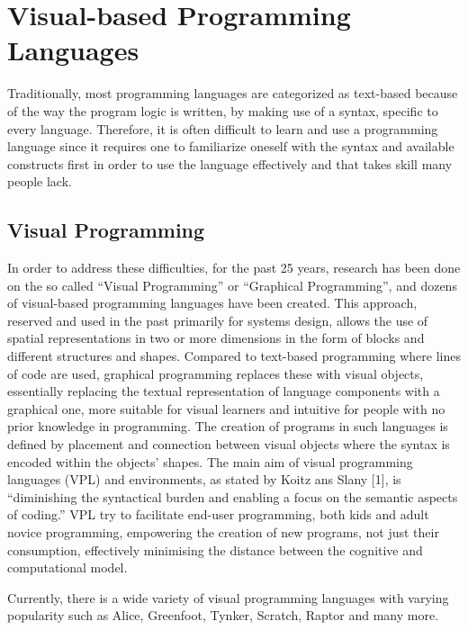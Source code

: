 \section{Visual-based Programming Languages}
\label{sec:visual_based_programming_languages}

Traditionally, most programming languages are categorized as text-based because of the way the program logic is written, by making use of a syntax, specific to every language. Therefore, it is often difficult to learn and use a programming language since it requires one to familiarize oneself with the syntax and available constructs first in order to use the language effectively and that takes skill many people lack. 

\subsection{Visual Programming}
In order to address these difficulties, for the past 25 years, research has been done on the so called “Visual Programming” or “Graphical Programming”, and dozens of visual-based programming languages have been created. This approach, reserved and used in the past primarily for systems design, allows the use of spatial representations in two or more dimensions in the form of blocks and different structures and shapes. Compared to text-based programming where lines of code are used, graphical programming replaces these with visual objects, essentially replacing the textual representation of language components with a graphical one, more suitable for visual learners and intuitive for people with no prior knowledge in programming. The creation of programs in such languages is defined by placement and connection between visual objects where the syntax is encoded within the objects' shapes.  
The main aim of visual programming languages (VPL) and environments, as stated by Koitz ans Slany [1], is “diminishing the syntactical burden and enabling a focus on the semantic aspects of coding.” VPL try to facilitate end-user programming, both kids and adult novice programming, empowering the creation of new programs, not just their consumption, effectively minimising the distance between the cognitive and computational model.

Currently, there is a wide variety of visual programming languages with varying popularity such as Alice, Greenfoot, Tynker, Scratch, Raptor and many more.


